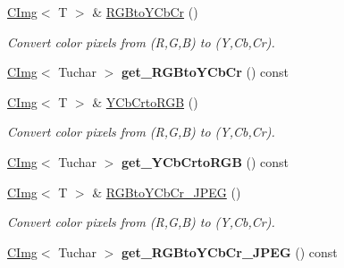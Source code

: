 \begin{DoxyCompactItemize}
\item 
\hypertarget{structcimg__library_1_1CImg_afbc08f08341e56ebf9b27e3ddacc9ee6}{
\hyperlink{structcimg__library_1_1CImg}{CImg}$<$ T $>$ \& \hyperlink{structcimg__library_1_1CImg_afbc08f08341e56ebf9b27e3ddacc9ee6}{RGBtoYCbCr} ()}
\label{structcimg__library_1_1CImg_afbc08f08341e56ebf9b27e3ddacc9ee6}

\begin{DoxyCompactList}\small\item\em Convert color pixels from (R,G,B) to (Y,Cb,Cr). \item\end{DoxyCompactList}\item 
\hypertarget{structcimg__library_1_1CImg_aa2eaa2a2424f51de318ababa3c076eec}{
\hyperlink{structcimg__library_1_1CImg}{CImg}$<$ Tuchar $>$ {\bfseries get\_\-RGBtoYCbCr} () const }
\label{structcimg__library_1_1CImg_aa2eaa2a2424f51de318ababa3c076eec}

\item 
\hypertarget{structcimg__library_1_1CImg_a93b6905e43cebf17d9d98f926d353a11}{
\hyperlink{structcimg__library_1_1CImg}{CImg}$<$ T $>$ \& \hyperlink{structcimg__library_1_1CImg_a93b6905e43cebf17d9d98f926d353a11}{YCbCrtoRGB} ()}
\label{structcimg__library_1_1CImg_a93b6905e43cebf17d9d98f926d353a11}

\begin{DoxyCompactList}\small\item\em Convert color pixels from (R,G,B) to (Y,Cb,Cr). \item\end{DoxyCompactList}\item 
\hypertarget{structcimg__library_1_1CImg_ad4e78b28b3fdb65fdd2889e2cfaa148a}{
\hyperlink{structcimg__library_1_1CImg}{CImg}$<$ Tuchar $>$ {\bfseries get\_\-YCbCrtoRGB} () const }
\label{structcimg__library_1_1CImg_ad4e78b28b3fdb65fdd2889e2cfaa148a}

\item 
\hypertarget{structcimg__library_1_1CImg_a6d2d46e8426a910273f1a97b6a2b345c}{
\hyperlink{structcimg__library_1_1CImg}{CImg}$<$ T $>$ \& \hyperlink{structcimg__library_1_1CImg_a6d2d46e8426a910273f1a97b6a2b345c}{RGBtoYCbCr\_\-JPEG} ()}
\label{structcimg__library_1_1CImg_a6d2d46e8426a910273f1a97b6a2b345c}

\begin{DoxyCompactList}\small\item\em Convert color pixels from (R,G,B) to (Y,Cb,Cr). \item\end{DoxyCompactList}\item 
\hypertarget{structcimg__library_1_1CImg_afc0192247b5251fecd75bf9d20e9c494}{
\hyperlink{structcimg__library_1_1CImg}{CImg}$<$ Tuchar $>$ {\bfseries get\_\-RGBtoYCbCr\_\-JPEG} () const }
\label{structcimg__library_1_1CImg_afc0192247b5251fecd75bf9d20e9c494}


\end{DoxyCompactItemize}
